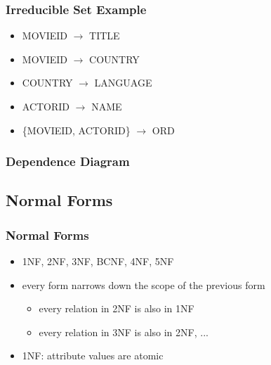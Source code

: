 \documentclass[dvipsnames]{beamer}
\begin{document}
\begin{frame}
  \frametitle{Irreducible Set Example}

  \begin{example}
    \begin{itemize}
      \item MOVIEID $\rightarrow$ TITLE
      \item MOVIEID $\rightarrow$ COUNTRY
      \item COUNTRY $\rightarrow$ LANGUAGE
      \item ACTORID $\rightarrow$ NAME
      \item \{MOVIEID, ACTORID\} $\rightarrow$ ORD
    \end{itemize}
  \end{example}
\end{frame}

\begin{frame}
  \frametitle{Dependence Diagram}

  \begin{example}
    \begin{center}
    \end{center}
  \end{example}
\end{frame}

\subsection{Normal Forms}

\begin{frame}
  \frametitle{Normal Forms}

  \begin{itemize}
    \item 1NF, 2NF, 3NF, BCNF, 4NF, 5NF

    \item every form narrows down the scope of the previous form
    \begin{itemize}
      \item every relation in 2NF is also in 1NF
      \item every relation in 3NF is also in 2NF, ...
    \end{itemize}

    \pause
    \medskip
    \item 1NF: attribute values are atomic
  \end{itemize}
\end{frame}
\end{document}
